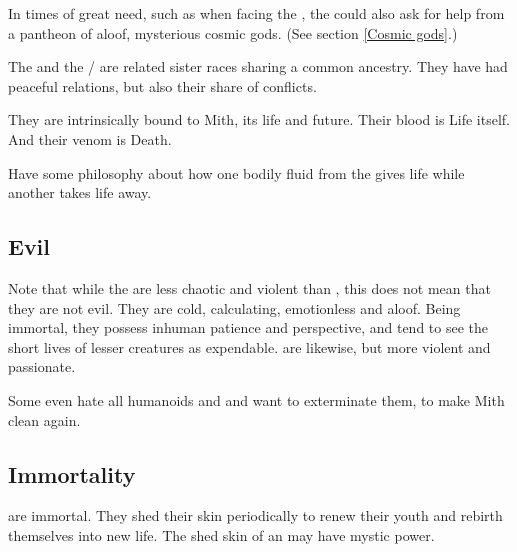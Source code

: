 In times of great need, such as when facing the \xzaishann, the \ophidians{} could also ask for help from a pantheon of aloof, mysterious cosmic gods. (See section \ref{Cosmic gods}.)

The \ophidians{} and the \nagae/\vlekkeshsala{} are related sister races sharing a common ancestry. They have had peaceful relations, but also their share of conflicts.


They are intrinsically bound to Mith, its life and future. Their blood is Life itself. And their venom is Death. 

Have some philosophy about how one bodily fluid from the \ophidians{} gives life while another takes life away. 







\subsection{Evil}
Note that while the \ophidians{} are less chaotic and violent than \dragons, this does not mean that they are not evil. They are cold, calculating, emotionless and aloof. Being immortal, they possess inhuman patience and perspective, and tend to see the short lives of lesser creatures as expendable. \Dragons{} are likewise, but more violent and passionate. 


Some \ophidians{} even hate all humanoids and \dragons{} and want to exterminate them, to make Mith clean again.







\subsection{Immortality}
\label{Ophidian immortality}
\label{\Ophidian{} immortality}
\Ophidians{} are immortal. They shed their skin periodically to renew their youth and rebirth themselves into new life. %
The shed skin of an \ophidian{} may have mystic power. 

